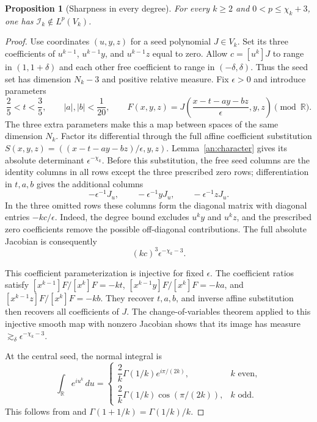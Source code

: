 \documentclass[11pt]{amsart}
\newtheorem{proposition}[theorem]{Proposition}
\theoremstyle{definition}
\theoremstyle{remark}
\numberwithin{equation}{section}
\begin{document}
\begin{proposition}[Sharpness in every degree]\label{an:necessity}
For every $k\ge2$ and $0<p\le\chi_k+3$, one has $\mathcal I_k\notin L^p(V_k)$.
\end{proposition}
\begin{proof}
Use coordinates $(u,y,z)$ for a seed polynomial $J\in V_k$. Set its three coefficients of $u^{k-1}$, $u^{k-1}y$, and $u^{k-1}z$ equal to zero. Allow $c=[u^k]J$ to range in $(1,1+\delta)$ and each other free coefficient to range in $(-\delta,\delta)$. Thus the seed set has dimension $N_k-3$ and positive relative measure. Fix $\epsilon>0$ and introduce parameters
\[
\frac25<t<\frac35,\qquad |a|,|b|<\frac1{20},\qquad F(x,y,z)=J\left(\frac{x-t-ay-bz}{\epsilon},y,z\right)\pmod{\mathbb R}.
\]
The three extra parameters make this a map between spaces of the same dimension $N_k$. Factor its differential through the full affine coefficient substitution $S(x,y,z)=((x-t-ay-bz)/\epsilon,y,z)$. Lemma~\ref{an:character} gives its absolute determinant $\epsilon^{-\chi_k}$. Before this substitution, the free seed columns are the identity columns in all rows except the three prescribed zero rows; differentiation in $t,a,b$ gives the additional columns
\[
-\epsilon^{-1}J_u,\qquad -\epsilon^{-1}yJ_u,\qquad -\epsilon^{-1}zJ_u.
\]
In the three omitted rows these columns form the diagonal matrix with diagonal entries $-kc/\epsilon$. Indeed, the degree bound excludes $u^ky$ and $u^kz$, and the prescribed zero coefficients remove the possible off-diagonal contributions. The full absolute Jacobian is consequently
\begin{equation}\label{an:necessity-jacobian}
(kc)^3\epsilon^{-\chi_k-3}.
\end{equation}

This coefficient parameterization is injective for fixed $\epsilon$. The coefficient ratios satisfy $[x^{k-1}]F/[x^k]F=-kt$, $[x^{k-1}y]F/[x^k]F=-ka$, and $[x^{k-1}z]F/[x^k]F=-kb$. They recover $t,a,b$, and inverse affine substitution then recovers all coefficients of $J$. The change-of-variables theorem applied to this injective smooth map with nonzero Jacobian shows that its image has measure $\gtrsim_\delta\epsilon^{-\chi_k-3}$.

At the central seed, the normal integral is
\begin{equation}\label{an:normal-gamma}
\int_{\mathbb R}e^{iu^k}\,du=\begin{cases}\dfrac2k\Gamma(1/k)e^{i\pi/(2k)},&k\text{ even},\\[1mm]\dfrac2k\Gamma(1/k)\cos(\pi/(2k)),&k\text{ odd}.\end{cases}
\end{equation}
This follows from \cite[equations (5.9.8)--(5.9.9)]{DLMF} and $\Gamma(1+1/k)=\Gamma(1/k)/k$.


\end{proof}
\end{document}
